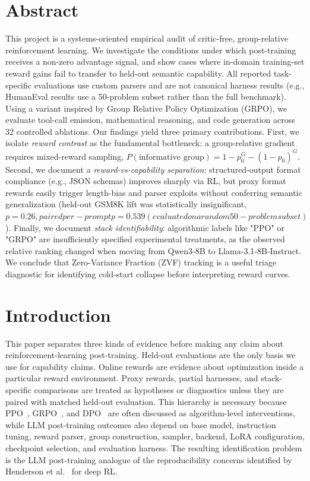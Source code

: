 \documentclass[12pt,a4paper]{report}
\begin{document}
\chapter*{Abstract}
This project is a systems-oriented empirical audit of critic-free, group-relative reinforcement learning. We investigate the conditions under which post-training receives a non-zero advantage signal, and show cases where in-domain training-set reward gains fail to transfer to held-out semantic capability. All reported task-specific evaluations use custom parsers and are not canonical harness results (e.g., HumanEval results use a 50-problem subset rather than the full benchmark). Using a variant inspired by Group Relative Policy Optimization (GRPO), we evaluate tool-call emission, mathematical reasoning, and code generation across 32 controlled ablations. Our findings yield three primary contributions. First, we isolate \textit{reward contrast} as the fundamental bottleneck: a group-relative gradient requires mixed-reward sampling, $P(\text{informative group}) = 1 - p_0^{G} - (1-p_0)^{G}$. Second, we document a \textit{reward-vs-capability separation}: structured-output format compliance (e.g., JSON schemas) improves sharply via RL, but proxy format rewards easily trigger length-bias and parser exploits without conferring semantic generalization (held-out GSM8K lift was statistically insignificant, $p=0.26, paired per-prompt p=0.539 (evaluated on a random 50-problem subset)$). Finally, we document \textit{stack identifiability}: algorithmic labels like "PPO" or "GRPO" are insufficiently specified experimental treatments, as the observed relative ranking changed when moving from Qwen3-8B to Llama-3.1-8B-Instruct. We conclude that Zero-Variance Fraction (ZVF) tracking is a useful triage diagnostic for identifying cold-start collapse before interpreting reward curves.

\tableofcontents
\listoffigures
\listoftables
\clearpage
{}

\chapter{Introduction}
\label{sec:intro}

This paper separates three kinds of evidence before making any claim about
reinforcement-learning post-training.  Held-out evaluations are the only basis
we use for capability claims.  Online rewards are evidence about optimization
inside a particular reward environment.  Proxy rewards, partial harnesses, and
stack-specific comparisons are treated as hypotheses or diagnostics unless they
are paired with matched held-out evaluation.  This hierarchy is necessary
because PPO~\citep{schulman2017ppo}, GRPO~\citep{shao2024deepseekmath},
and DPO~\citep{rafailov2023dpo} are often discussed as algorithm-level
interventions, while LLM post-training outcomes also depend on base model,
instruction tuning, reward parser, group construction, sampler, backend, LoRA
configuration, checkpoint selection, and evaluation harness.  The resulting
identification problem is the LLM post-training analogue of the reproducibility
concerns identified by Henderson et al.~\citep{henderson2018deep} for deep RL.
\end{document}
